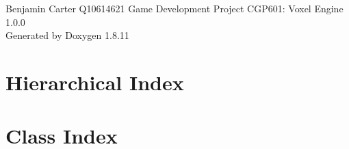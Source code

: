 \documentclass[twoside]{book}
\newcommand{\+}{\discretionary{\mbox{\scriptsize$\hookleftarrow$}}{}{}}
\newcommand{\clearemptydoublepage}{%
  \newpage{\pagestyle{empty}\cleardoublepage}%
}
\begin{document}
\hypersetup{pageanchor=false,
             bookmarksnumbered=true,
             pdfencoding=unicode
            }
\begin{titlepage}
\vspace*{7cm}
\begin{center}%
{\Large Benjamin Carter Q10614621 Game Development Project C\+G\+P601\+: Voxel Engine \\[1ex]\large 1.\+0.\+0 }\\
\vspace*{1cm}
{\large Generated by Doxygen 1.8.11}\\
\end{center}
\end{titlepage}
\clearemptydoublepage
\tableofcontents
\clearemptydoublepage
{}
\hypersetup{pageanchor=true}

\chapter{Hierarchical Index}

\chapter{Class Index}

\end{document}
